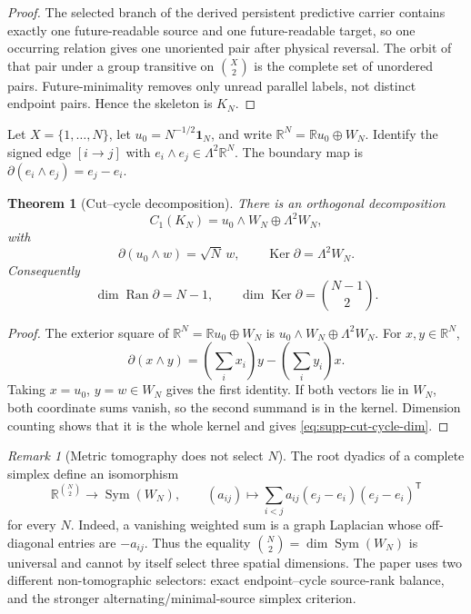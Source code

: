 \documentclass[11pt]{article}
\newtheorem{theorem}{Theorem}[section]
\theoremstyle{definition}
\theoremstyle{remark}
\newtheorem{remark}[remark]{Remark}
\newcommand{\R}{\mathbb R}
\newcommand{\one}{\mathbf 1}
\newcommand{\Ker}{\operatorname{Ker}}
\newcommand{\Ran}{\operatorname{Ran}}
\newcommand{\Sym}{\operatorname{Sym}}
\begin{document}
\begin{proof}
The selected branch of the derived persistent predictive carrier contains
exactly one future-readable source and one future-readable target, so one
occurring relation gives one unoriented pair after physical reversal.  The
orbit of that pair under a group transitive on $\binom{X}{2}$ is the complete
set of unordered pairs.  Future-minimality removes only unread parallel labels,
not distinct endpoint pairs.  Hence the skeleton is $K_N$.
\end{proof}

Let $X=\{1,\ldots,N\}$, let $u_0=N^{-1/2}\one_N$, and write
$\R^N=\R u_0\oplus W_N$.  Identify the signed edge $[i\to j]$ with
$e_i\wedge e_j\in\Lambda^2\R^N$.  The boundary map is
$\partial(e_i\wedge e_j)=e_j-e_i$.

\begin{theorem}[Cut--cycle decomposition]
\label{thm:supp-cut-cycle}
There is an orthogonal decomposition
\begin{equation}
 C_1(K_N)=u_0\wedge W_N\oplus\Lambda^2W_N,
 \label{eq:supp-cut-cycle}
\end{equation}
with
\begin{equation}
 \partial(u_0\wedge w)=\sqrt N\,w,
 \qquad
 \Ker\partial=\Lambda^2W_N.
 \label{eq:supp-boundary-action}
\end{equation}
Consequently
\begin{equation}
 \dim\Ran\partial=N-1,
 \qquad
 \dim\Ker\partial=\binom{N-1}{2}.
 \label{eq:supp-cut-cycle-dim}
\end{equation}
\end{theorem}

\begin{proof}
The exterior square of
$\R^N=\R u_0\oplus W_N$ is
$u_0\wedge W_N\oplus\Lambda^2W_N$.  For $x,y\in\R^N$,
\[
 \partial(x\wedge y)
 =\left(\sum_ix_i\right)y-
   \left(\sum_iy_i\right)x.
\]
Taking $x=u_0$, $y=w\in W_N$ gives the first identity.  If both vectors lie in
$W_N$, both coordinate sums vanish, so the second summand is in the kernel.
Dimension counting shows that it is the whole kernel and gives
\eqref{eq:supp-cut-cycle-dim}.
\end{proof}

\begin{remark}[Metric tomography does not select $N$]
The root dyadics of a complete simplex define an isomorphism
\[
 \R^{\binom N2}\longrightarrow\Sym(W_N),
 \qquad
 (a_{ij})\longmapsto\sum_{i<j}a_{ij}
 (e_j-e_i)(e_j-e_i)^{\mathsf T}
\]
for every $N$.  Indeed, a vanishing weighted sum is a graph Laplacian whose
off-diagonal entries are $-a_{ij}$.  Thus the equality
$\binom N2=\dim\Sym(W_N)$ is universal and cannot by itself select three
spatial dimensions.  The paper uses two different non-tomographic selectors:
exact endpoint--cycle source-rank balance, and the stronger
alternating/minimal-source simplex criterion.
\end{remark}
\end{document}
